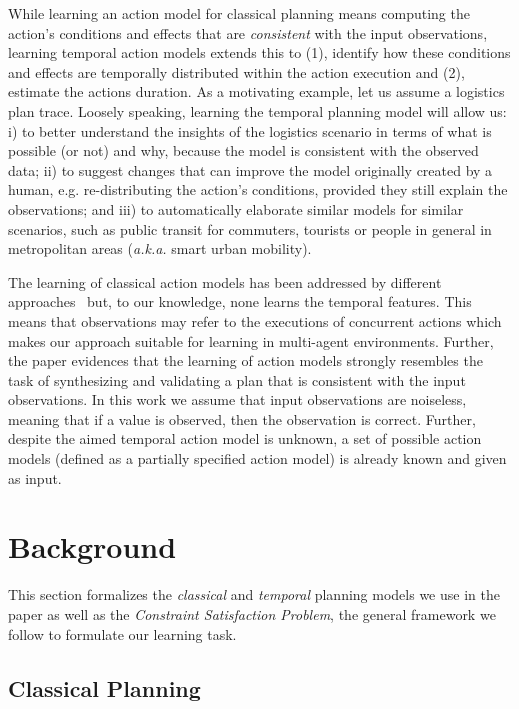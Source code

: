 \documentclass[runningheads]{llncs}
\begin{document}
While learning an action model for classical planning means computing the action's conditions and effects that are {\em consistent} with the input observations, learning temporal action models extends this to (1), identify how these conditions and effects are temporally distributed within the action execution and (2), estimate the actions duration. As a motivating example, let us assume a logistics plan trace. Loosely speaking, learning the temporal planning model will allow us: i) to better understand the insights of the logistics scenario in terms of what is possible (or not) and why, because the model is consistent with the observed data; ii) to suggest changes that can improve the model originally created by a human, e.g. re-distributing the action's conditions, provided they still explain the observations; and iii) to automatically elaborate similar models for similar scenarios, such as public transit for commuters, tourists or people in general in metropolitan areas (\emph{a.k.a.} smart urban mobility). 

The learning of classical action models has been addressed by different approaches~\cite{arora2018review} but, to our knowledge, none learns the temporal features. This means that observations may refer to the executions of concurrent actions which makes our approach suitable for learning in multi-agent environments. Further, the paper evidences that the learning of action models strongly resembles the task of synthesizing and validating a plan that is consistent with the input observations. In this work we assume that input observations are noiseless, meaning that if a value is observed, then the observation is correct. Further, despite the aimed temporal action model is unknown, a set of possible action models (defined as a partially specified action model) is already known and given as input.




\section{Background}
\label{sec:background}

This section formalizes the {\em classical} and {\em temporal} planning models we use in the paper as well as the {\em Constraint Satisfaction Problem}, the general framework we follow to formulate our learning task.

\subsection{Classical Planning}
\label{sec:classicalplanning}
\end{document}
